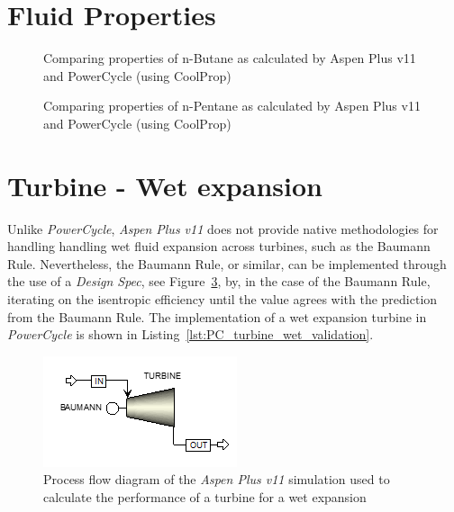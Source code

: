 \section{Fluid Properties}
        
    \begin{figure}[H]
        \centering
        
        \caption{Comparing properties of n-Butane as calculated by Aspen Plus v11 and PowerCycle (using CoolProp)}
        \label{fig:powercycle_val_butane}
    \end{figure}
    
    \begin{figure}[H]
        \centering
        
        \caption{Comparing properties of n-Pentane as calculated by Aspen Plus v11 and PowerCycle (using CoolProp)}
        \label{fig:powercycle_val_pentane}
    \end{figure}

\section{Turbine - Wet expansion}
    Unlike \emph{PowerCycle}, \emph{Aspen Plus v11} does not provide native methodologies for handling handling wet fluid expansion across turbines, such as the Baumann Rule. Nevertheless, the Baumann Rule, or similar, can be implemented through the use of a \emph{Design Spec}, see Figure~\ref{fig:Aspen_turb_wet_validation}, by, in the case of the Baumann Rule, iterating on the isentropic efficiency until the value agrees with the prediction from the Baumann Rule. The implementation of a wet expansion turbine in \emph{PowerCycle} is shown in Listing~\ref{lst:PC_turbine_wet_validation}.
    
    \begin{figure}[H]
        \centering
        \includegraphics{Content/Appendices/Appendix_F/Figures/AspenPlus_TurbineWetValidation.png}
        \caption{Process flow diagram of the \emph{Aspen Plus v11} simulation used to calculate the performance of a turbine for a wet expansion}
        \label{fig:Aspen_turb_wet_validation}
    \end{figure}

